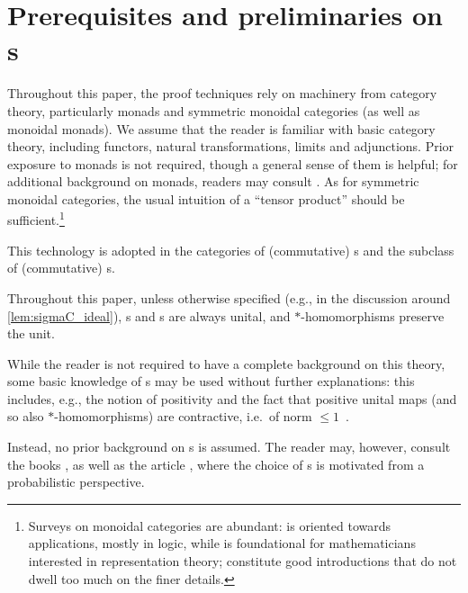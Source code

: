 \section{Prerequisites and preliminaries on \texorpdfstring{\cstars{}s}{σC*-algebras}}\label{sec:preliminaries}
Throughout this paper, the proof techniques rely on machinery from category theory, particularly monads and symmetric monoidal categories (as well as monoidal monads).
We assume that the reader is familiar with basic category theory, including functors, natural transformations, limits and adjunctions. 
Prior exposure to monads is not required, though a general sense of them is helpful; for additional background on monads, readers may consult \cite[Sections~4.1 and~4.2]{borceux94handbook2}.
As for symmetric monoidal categories, the usual intuition of a ``tensor product'' should be sufficient.\footnote{Surveys on monoidal categories are abundant: \cite{selinger} is oriented towards applications, mostly in logic, while \cite{EGNO} is foundational for mathematicians interested in representation theory; \cite{milne_notes,borceux94handbook2,cwm} constitute good introductions that do not dwell too much on the finer details.}

This technology is adopted in the categories of (commutative) \cstar{}s and the subclass of (commutative) \cstars{}s. 

\begin{convention}\label{conv:unital}
Throughout this paper, unless otherwise specified (e.g., in the discussion around \autoref{lem:sigmaC_ideal}), \cstar{}s and \cstars{}s are always unital, and $*$-homomorphisms preserve the unit.
\end{convention} 

While the reader is not required to have a complete background on this theory, some basic knowledge of \cstar{}s may be used without further explanations: this includes, e.g., the notion of positivity and the fact that positive unital maps (and so also $*$-homomorphisms) are contractive, i.e.\ of norm $\le 1$~\cite[Proposition 2.1]{paulsen2002}.

Instead, no prior background on \cstars{}s is assumed.
The reader may, however, consult the books \cite{saito15monotone,pedersen2018automgroups}, as well as the article \cite{fritz2025categories}, where the choice of \cstars{}s is motivated from a probabilistic perspective.

